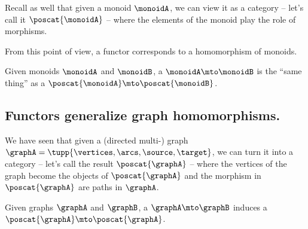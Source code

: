 Recall as well that given a monoid $\monoidA$, we can view it as a category -- let's call it $\poscat{\monoidA}$ -- where the elements of the monoid play the role of morphisms.

From this point of view, a functor corresponds to a homomorphism of monoids.

\begin{lemma}
    \label{lem:monoid-hom-as-functor}
    Given monoids $\monoidA$ and $\monoidB$, a  $\monoidA \mto \monoidB$ is the ``same thing'' as a  $\poscat{\monoidA} \mto \poscat{\monoidB}$.
\end{lemma}


\subsection{Functors generalize graph homomorphisms.}


We have seen that given a (directed multi-) graph $\graphA=\tupp{\vertices,\arcs, \source,\target}$, we can turn it into a category -- let's call the result $\poscat{\graphA}$ -- where the vertices of the graph become the objects of $\poscat{\graphA}$ and the morphism in $\poscat{\graphA}$ are paths in $\graphA$.

\begin{lemma}
    \label{lem:graph-hom-to-functor}
    Given graphs $\graphA$ and $\graphB$, a  $\graphA \mto \graphB$ induces a  $\poscat{\graphA} \mto \poscat{\graphA}$.
\end{lemma}



